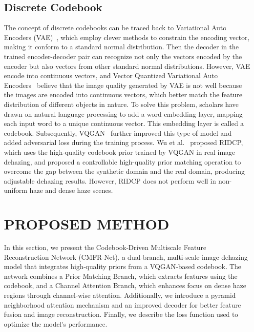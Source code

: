 \documentclass[journal]{IEEEtran}
\begin{document}
\subsection{Discrete Codebook}
The concept of discrete codebooks can be traced back to Variational Auto Encoders (VAE)~\cite{kingma2013auto}, which employ clever methods to constrain the encoding vector, making it conform to a standard normal distribution. Then the decoder in the trained encoder-decoder pair can recognize not only the vectors encoded by the encoder but also vectors from other standard normal distributions. However, VAE encode into continuous vectors, and Vector Quantized Variational Auto Encoders~\cite{van2017neural} believe that the image quality generated by VAE is not well because the images are encoded into continuous vectors, which better match the feature distribution of different objects in nature. To solve this problem, scholars have drawn on natural language processing to add a word embedding layer, mapping each input word to a unique continuous vector. This embedding layer is called a codebook. Subsequently, VQGAN~\cite{esser2021taming} further improved this type of model and added adversarial loss during the training process. Wu et al.~\cite{wu2023ridcp} proposed RIDCP, which uses the high-quality codebook prior trained by VQGAN in real image dehazing, and proposed a controllable high-quality prior matching operation to overcome the gap between the synthetic domain and the real domain, producing adjustable dehazing results. However, RIDCP does not perform well in non-uniform haze and dense haze scenes.



\section{PROPOSED METHOD}

In this section, we present the Codebook‑Driven Multiscale Feature Reconstruction Network (CMFR‑Net), a dual‑branch, multi‑scale image dehazing model that integrates high‑quality priors from a VQGAN‑based codebook. The network combines a Prior Matching Branch, which extracts features using the codebook, and a Channel Attention Branch, which enhances focus on dense haze regions through channel-wise attention. Additionally, we introduce a pyramid neighborhood attention mechanism and an improved decoder for better feature fusion and image reconstruction. Finally, we describe the loss function used to optimize the model’s performance.
\end{document}
